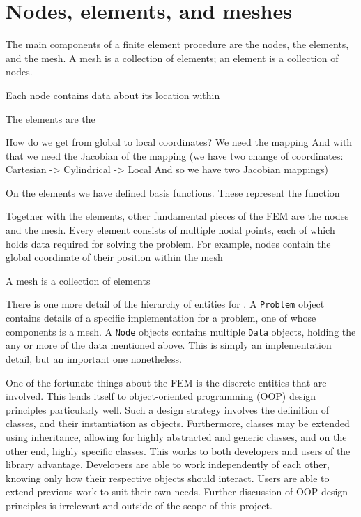 
\section{Nodes, elements, and meshes}

The main components of a finite element procedure are the nodes, the elements, and the mesh.
A mesh is a collection of elements; an element is a collection of nodes.

Each node contains data about its location within 

The elements are the 

How do we get from global to local coordinates?
We need the mapping
And with that we need the Jacobian of the mapping
(we have two change of coordinates: Cartesian -> Cylindrical -> Local
And so we have two Jacobian mappings)

On the elements we have defined basis functions.
These represent the function 

Together with the elements, other fundamental pieces of the FEM are the nodes and the mesh.
Every element consists of multiple nodal points, each of which holds data required for solving the problem.
For example, nodes contain the global coordinate of their position within the mesh

A mesh is a collection of elements


There is one more detail of the hierarchy of entities for \oomph.
A \texttt{Problem} object contains details of a specific implementation for a problem, one of whose components is a mesh.
A \texttt{Node} objects contains multiple \texttt{Data} objects, holding the any or more of the data mentioned above.
This is simply an implementation detail, but an important one nonetheless. 


One of the fortunate things about the FEM is the discrete entities that are involved.
This lends itself to object-oriented programming (OOP) design principles particularly well.
Such a design strategy involves the definition of classes, and their instantiation as objects.
Furthermore, classes may be extended using inheritance, allowing for highly abstracted and generic classes, and on the other end, highly specific classes.
This works to both developers and users of the library advantage.
Developers are able to work independently of each other, knowing only how their respective objects should interact.
Users are able to extend previous work to suit their own needs.
Further discussion of OOP design principles is irrelevant and outside of the scope of this project.






